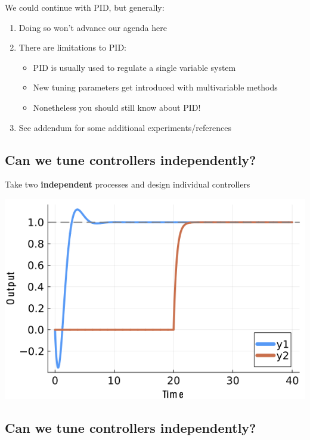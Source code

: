 \documentclass[
  letterpaper,
  DIV=11,
  numbers=noendperiod,
  oneside]{scrartcl}
\providecommand{\tightlist}{%
  \setlength{\itemsep}{0pt}\setlength{\parskip}{0pt}}\usepackage{longtable,booktabs,array}
\begin{document}
We could continue with PID, but generally:

\begin{enumerate}
\def\labelenumi{\arabic{enumi}.}
\tightlist
\item
  Doing so won't advance our agenda here
\item
  There are limitations to PID:

  \begin{itemize}
  \tightlist
  \item
    PID is usually used to regulate a single variable system
  \item
    New tuning parameters get introduced with multivariable methods
  \item
    Nonetheless you should still know about PID!
  \end{itemize}
\item
  See addendum for some additional experiments/references
\end{enumerate}

\subsection{Can we tune controllers
independently?}\label{can-we-tune-controllers-independently}

Take two \textbf{independent} processes and design individual
controllers

\begin{center}
\includegraphics{figs/independent_loops.png}
\end{center}

\subsection{Can we tune controllers
independently?}\label{can-we-tune-controllers-independently-1}
\end{document}
